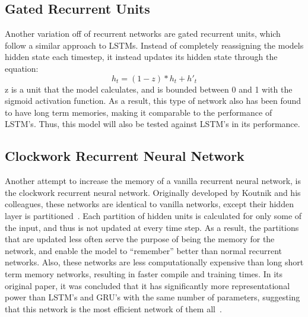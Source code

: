 \documentclass{article}
\begin{document}
\subsection{Gated Recurrent Units}
Another variation off of recurrent networks are gated recurrent units, which
follow a similar approach to LSTMs. Instead of completely reassigning the models
hidden state each timestep, it instead updates its hidden state through the
equation:
$$h_t = (1 - z) * h_t + h'_t $$
z is a unit that the model calculates, and is bounded between 0 and 1 with the
sigmoid activation function. As a result, this type of network also has been
found to have long term memories, making it comparable to the performance of
LSTM's. Thus, this model will also be tested against LSTM's in its performance.


\subsection{Clockwork Recurrent Neural Network}
Another attempt to increase the memory of a vanilla recurrent neural network, is
the clockwork recurrent neural network. Originally developed by Koutnik and his
colleagues, these networks are identical to vanilla networks, except their
hidden layer is partitioned~\cite{cw-rnn}. Each partition of hidden units is
calculated for only some of the input, and thus is not updated at every time
step. As a result, the partitions that are updated less often serve the purpose
of being the memory for the network, and enable the model to ``remember'' better
than normal recurrent networks. Also, these networks are less computationally
expensive than long short term memory networks, resulting in faster compile and
training times. In its original paper, it was concluded that it has
significantly more representational power than LSTM's and GRU's with the same
number of parameters, suggesting that this network is the most efficient network
of them all~\cite{cw-rnn}.
\end{document}
